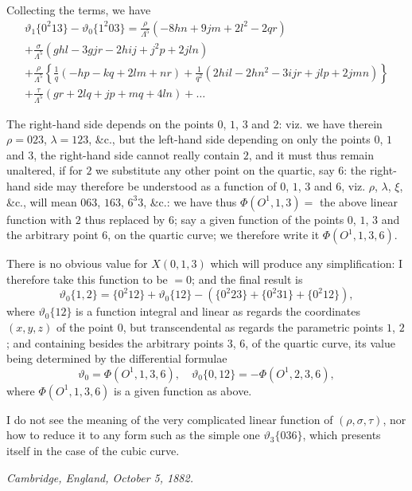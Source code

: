 \documentclass[11pt,a4paper]{book}
\begin{document}
\newpage
\begin{art}\label{art:72}
Collecting the terms, we have
\begin{multline*}
\vartheta_1\{0^2 13\} - \vartheta_0\{1^2 03\} = \frac{\rho}{\Lambda^5}(-8hn + 9jm + 2l^2 - 2qr) \\
+ \frac{\sigma}{\Lambda^5}(ghl - 3gjr - 2hij + j^2p + 2jln) \\
+ \frac{\rho}{\Lambda^5}\left\{\frac{1}{q}(-hp - kq + 2lm + nr) + \frac{1}{q^2}(2hil - 2hn^2 - 3ijr + jlp + 2jmn)\right\} \\
+ \frac{\tau}{\Lambda^5}(gr + 2lq + jp + mq + 4ln) + \ldots
\end{multline*}
\end{art}

\begin{art}\label{art:73}
The right-hand side depends on the points $0$, $1$, $3$ and $2$: viz. we have therein $\rho = 023$, $\lambda = 123$, \&c., but the left-hand side depending on only the points $0$, $1$ and $3$, the right-hand side cannot really contain $2$, and it must thus remain unaltered, if for $2$ we substitute any other point on the quartic, say $6$: the right-hand side may therefore be understood as a function of $0$, $1$, $3$ and $6$, viz. $\rho$, $\lambda$, $\xi$, \&c., will mean $063$, $163$, $6^3 3$, \&c.: we have thus $\Phi(O^1, 1, 3) = $ the above linear function with $2$ thus replaced by $6$; say a given function of the points $0$, $1$, $3$ and the arbitrary point $6$, on the quartic curve; we therefore write it $\Phi(O^1, 1, 3, 6)$.

There is no obvious value for $X(0, 1, 3)$ which will produce any simplification: I therefore take this function to be $= 0$; and the final result is
\[
\vartheta_0\{1, 2\} = \{0^2 12\} + \vartheta_0\{12\} - (\{0^2 23\} + \{0^2 31\} + \{0^2 12\}),
\]
where $\vartheta_0\{12\}$ is a function integral and linear as regards the coordinates $(x, y, z)$ of the point $0$, but transcendental as regards the parametric points $1$, $2$; and containing besides the arbitrary points $3$, $6$, of the quartic curve, its value being determined by the differential formulae
\[
\vartheta_0 = \Phi(O^1, 1, 3, 6), \quad \vartheta_0\{0, 12\} = -\Phi(O^1, 2, 3, 6),
\]
where $\Phi(O^1, 1, 3, 6)$ is a given function as above.

I do not see the meaning of the very complicated linear function of $(\rho, \sigma, \tau)$, nor how to reduce it to any form such as the simple one $\vartheta_3\{036\}$, which presents itself in the case of the cubic curve.

\textit{Cambridge, England, October 5, 1882.}
\end{art}
\end{document}
